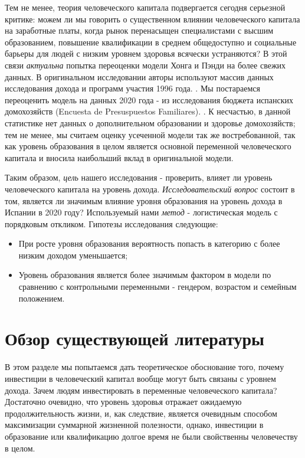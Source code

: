\documentclass[a4paper]{article}
\begin{document}
Тем не менее, теория человеческого капитала подвергается сегодня серьезной критике: можем ли мы говорить о существенном влиянии человеческого капитала на заработные платы, когда рынок перенасыщен специалистами с высшим образованием, повышение квалификации в среднем общедоступно и социальные барьеры для людей с низким уровнем здоровья всячески устраняются? В этой связи \textit{актуальна} попытка переоценки модели Хонга и Пэнди на более свежих данных. В оригинальном исследовании авторы используют массив данных исследования дохода и программ участия 1996 года. \cite[NBER, 1996]{NBER}.  Мы постараемся переоценить модель на данных 2020 года - из исследования бюджета испанских домохозяйств (Encuesta de Presuspuestos Familiares). \cite[INE, 2020]{INE}. К несчастью, в данной статистике нет данных о дополнительном образовании и здоровье домохозяйств; тем не менее, мы считаем оценку усеченной модели так же востребованной, так как уровень образования в целом является основной переменной человеческого капитала и вносила наибольший вклад в оригинальной модели. 

Таким образом, \textit{цель} нашего исследования - проверить, влияет ли уровень человеческого капитала на уровень дохода. \textit{Исследовательский вопрос} состоит в том, является ли значимым влияние уровня образования на уровень дохода в Испании в 2020 году? Используемый нами \textit{метод} - логистическая модель с порядковым откликом. Гипотезы исследования следующие:

\begin{itemize}
	\item При росте уровня образования вероятность попасть в категорию с более низким доходом уменьшается;
	\item Уровень образования является более значимым фактором в модели по сравнению с контрольными переменными - гендером, возрастом и семейным положением. 
\end{itemize}

\newpage
	
\section*{Обзор существующей литературы}
В этом разделе мы попытаемся дать теоретическое обоснование того, почему инвестиции в человеческий капитал вообще могут быть связаны с уровнем дохода. Зачем людям инвестировать в переменные человеческого капитала? Достаточно очевидно, что уровень здоровья отражает ожидаемую продолжительность жизни, и, как следствие, является очевидным способом максимизации суммарной жизненной полезности, однако, инвестиции в образование или квалификацию долгое время не были свойственны человечеству в целом. 
\end{document}
